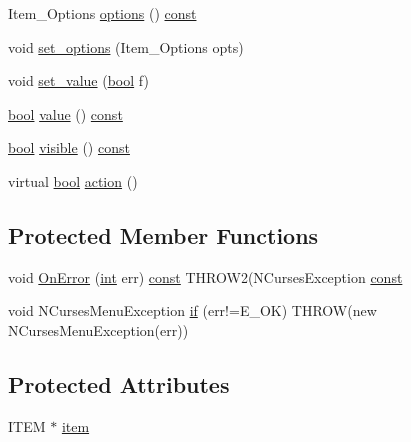 \begin{DoxyCompactItemize}
\item 
Item\-\_\-\-Options \hyperlink{class_n_curses_menu_item_a2a4a4ae374e25304aefff614b20ffca2}{options} () \hyperlink{term__entry_8h_a57bd63ce7f9a353488880e3de6692d5a}{const} 
\item 
void \hyperlink{class_n_curses_menu_item_a5dfe9bf12ee7ad0e76cfbbdd987ca5a1}{set\-\_\-options} (Item\-\_\-\-Options opts)
\item 
void \hyperlink{class_n_curses_menu_item_a31688b80257515b3d857613a420d9a4f}{set\-\_\-value} (\hyperlink{term__entry_8h_a002004ba5d663f149f6c38064926abac}{bool} f)
\item 
\hyperlink{term__entry_8h_a002004ba5d663f149f6c38064926abac}{bool} \hyperlink{class_n_curses_menu_item_a297496394e87e9f5864d7b12608df767}{value} () \hyperlink{term__entry_8h_a57bd63ce7f9a353488880e3de6692d5a}{const} 
\item 
\hyperlink{term__entry_8h_a002004ba5d663f149f6c38064926abac}{bool} \hyperlink{class_n_curses_menu_item_a9f029c4510bba8f3854ede9433bb5c48}{visible} () \hyperlink{term__entry_8h_a57bd63ce7f9a353488880e3de6692d5a}{const} 
\item 
virtual \hyperlink{term__entry_8h_a002004ba5d663f149f6c38064926abac}{bool} \hyperlink{class_n_curses_menu_item_a6d83033d038cbc5ceedd013cf667dc37}{action} ()
\end{DoxyCompactItemize}
\subsection*{Protected Member Functions}
\begin{DoxyCompactItemize}
\item 
void \hyperlink{class_n_curses_menu_item_a98945906cb51622c480447f2afb8877f}{On\-Error} (\hyperlink{term__entry_8h_ad65b480f8c8270356b45a9890f6499ae}{int} err) \hyperlink{term__entry_8h_a57bd63ce7f9a353488880e3de6692d5a}{const} T\-H\-R\-O\-W2(N\-Curses\-Exception \hyperlink{term__entry_8h_a57bd63ce7f9a353488880e3de6692d5a}{const} 
\item 
void N\-Curses\-Menu\-Exception \hyperlink{class_n_curses_menu_item_a1a3ca3e6473baaa26a292e65123aa49c}{if} (err!=E\-\_\-\-O\-K) T\-H\-R\-O\-W(new N\-Curses\-Menu\-Exception(err))
\end{DoxyCompactItemize}
\subsection*{Protected Attributes}
\begin{DoxyCompactItemize}
\item 
I\-T\-E\-M $\ast$ \hyperlink{class_n_curses_menu_item_a3ff6f6b710f000e6faa5f35482a036bd}{item}
\end{DoxyCompactItemize}
